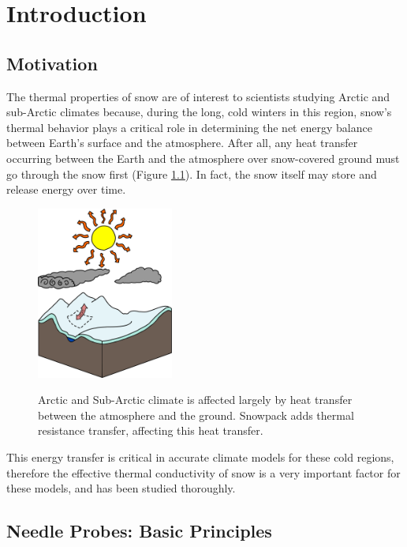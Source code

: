 \chapter{Introduction}
\label{sec:introduction}
\bigskip

\section{Motivation}
\label{sec:introduction:motivation}

The thermal properties of snow are of interest to scientists studying Arctic and
sub-Arctic climates because, during the long, cold winters in this region,
snow's thermal behavior plays a critical role in determining the net energy
balance between Earth's surface and the atmosphere. After all, any heat transfer
occurring between the Earth and the atmosphere over snow-covered ground must go
through the snow first (Figure \ref{fig:climate}). In fact, the snow
itself may store and release energy over time.

\begin{figure}[h]
\centering
\includegraphics[width=0.4\textwidth]{fig/climate.png}
\label{fig:climate}
\caption{Arctic and Sub-Arctic climate is affected largely by heat transfer
between the atmosphere and the ground. Snowpack adds thermal resistance
transfer, affecting this heat transfer.}
\end{figure}

This energy transfer is critical in accurate climate models for these cold
regions, therefore the effective thermal conductivity of snow is a very
important factor for these models, and has been studied thoroughly. \cite{sturm1, sturm2, sturm3}


\section{Needle Probes: Basic Principles}
\label{sec:introduction:needles}

